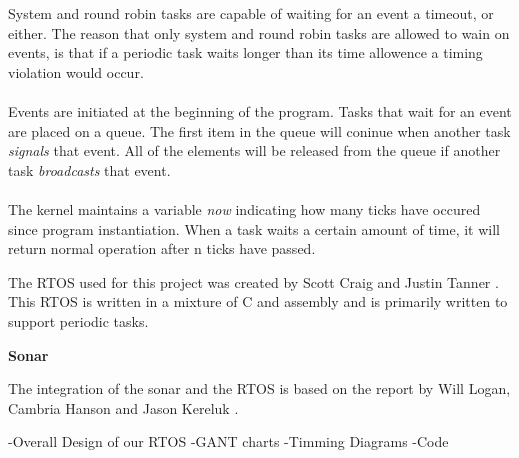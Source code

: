System and round robin tasks are capable of waiting for an event a timeout, or
either. The reason that only system and round robin tasks are allowed to wain on events, is that if a periodic task waits longer than its time allowence a timing violation would occur. \\

\\
Events are initiated at the beginning of the program. Tasks that wait for an event are placed on a queue. The first item in the queue will coninue when another task \textit{signals} that event. All of the elements will be released from the queue if another task \textit{broadcasts} that event. \\

\\
The kernel maintains a variable \textit{now} indicating how many ticks have occured since program instantiation. When a task waits a certain amount of time, it will return normal operation after n ticks have passed.





The RTOS used for this project was created by Scott Craig and Justin Tanner \cite{RTOSSJ}. This RTOS is written in a mixture of C and assembly and is primarily written to support periodic tasks.   




\noindent\textbf{Sonar}

The integration of the sonar and the RTOS is based on the report by Will
Logan, Cambria Hanson and Jason Kereluk \cite{autoB}.




-Overall Design of our RTOS
-GANT charts
-Timming Diagrams
-Code
